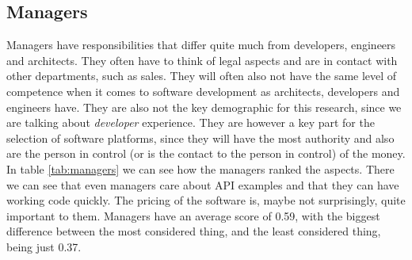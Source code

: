 \documentclass{cslthse-msc}
\begin{document}
    \subsection{Managers}
    Managers have responsibilities that differ quite much from developers, engineers and architects. They often have to think of legal aspects and are in contact with other departments, such as sales. They will often also not have the same level of competence when it comes to software development as architects, developers and engineers have. They are also not the key demographic for this research, since we are talking about \textit{developer} experience. They are however a key part for the selection of software platforms, since they will have the most authority and also are the person in control (or is the contact to the person in control) of the money. In table \ref{tab:managers} we can see how the managers ranked the aspects. There we can see that even managers care about API examples and that they can have working code quickly. The pricing of the software is, maybe not surprisingly, quite important to them. Managers have an average score of 0.59, with the biggest difference between the most considered thing, and the least considered thing, being just 0.37.
\end{document}
